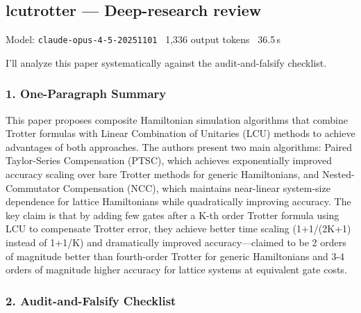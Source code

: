 \documentclass[10pt,letterpaper]{article}
\begin{document}
\subsection{lcutrotter --- Deep-research review}
\noindent\textcolor{muted}{\small Model: \texttt{claude-opus-4-5-20251101} \textperiodcentered\ 1,336 output tokens \textperiodcentered\ 36.5\,s}

I'll analyze this paper systematically against the audit-and-falsify checklist.

\hypertarget{one-paragraph-summary}{%
\subsubsection{1. One-Paragraph Summary}\label{one-paragraph-summary}}

This paper proposes composite Hamiltonian simulation algorithms that combine Trotter formulas with Linear Combination of Unitaries (LCU) methods to achieve advantages of both approaches. The authors present two main algorithms: Paired Taylor-Series Compensation (PTSC), which achieves exponentially improved accuracy scaling over bare Trotter methods for generic Hamiltonians, and Nested-Commutator Compensation (NCC), which maintains near-linear system-size dependence for lattice Hamiltonians while quadratically improving accuracy. The key claim is that by adding few gates after a K-th order Trotter formula using LCU to compensate Trotter error, they achieve better time scaling (1+1/(2K+1) instead of 1+1/K) and dramatically improved accuracy---claimed to be 2 orders of magnitude better than fourth-order Trotter for generic Hamiltonians and 3-4 orders of magnitude higher accuracy for lattice systems at equivalent gate costs.

\hypertarget{audit-and-falsify-checklist}{%
\subsubsection{2. Audit-and-Falsify Checklist}\label{audit-and-falsify-checklist}}
\end{document}
